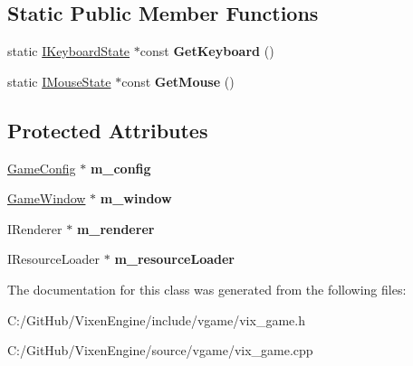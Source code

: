 \subsection*{Static Public Member Functions}
\begin{DoxyCompactItemize}
\item 
\hypertarget{class_vixen_1_1_game_add386b07418fc7e82e3e08884b9d6e81}{}static \hyperlink{class_vixen_1_1_i_keyboard_state}{I\+Keyboard\+State} $\ast$const {\bfseries Get\+Keyboard} ()\label{class_vixen_1_1_game_add386b07418fc7e82e3e08884b9d6e81}

\item 
\hypertarget{class_vixen_1_1_game_a35eaa19cca018f0536806ddccafc10c5}{}static \hyperlink{class_vixen_1_1_i_mouse_state}{I\+Mouse\+State} $\ast$const {\bfseries Get\+Mouse} ()\label{class_vixen_1_1_game_a35eaa19cca018f0536806ddccafc10c5}

\end{DoxyCompactItemize}
\subsection*{Protected Attributes}
\begin{DoxyCompactItemize}
\item 
\hypertarget{class_vixen_1_1_game_aa4387adbfcde68a48142de27e21d13d7}{}\hyperlink{class_vixen_1_1_game_config}{Game\+Config} $\ast$ {\bfseries m\+\_\+config}\label{class_vixen_1_1_game_aa4387adbfcde68a48142de27e21d13d7}

\item 
\hypertarget{class_vixen_1_1_game_a70ce88d7a768d448d12cd1dd1a35ec64}{}\hyperlink{class_vixen_1_1_game_window}{Game\+Window} $\ast$ {\bfseries m\+\_\+window}\label{class_vixen_1_1_game_a70ce88d7a768d448d12cd1dd1a35ec64}

\item 
\hypertarget{class_vixen_1_1_game_ac2ef4adaa4442c6afccb8adb8d0b3173}{}I\+Renderer $\ast$ {\bfseries m\+\_\+renderer}\label{class_vixen_1_1_game_ac2ef4adaa4442c6afccb8adb8d0b3173}

\item 
\hypertarget{class_vixen_1_1_game_aff8f829556f6551f37070592573c1d96}{}I\+Resource\+Loader $\ast$ {\bfseries m\+\_\+resource\+Loader}\label{class_vixen_1_1_game_aff8f829556f6551f37070592573c1d96}

\end{DoxyCompactItemize}


The documentation for this class was generated from the following files\+:\begin{DoxyCompactItemize}
\item 
C\+:/\+Git\+Hub/\+Vixen\+Engine/include/vgame/vix\+\_\+game.\+h\item 
C\+:/\+Git\+Hub/\+Vixen\+Engine/source/vgame/vix\+\_\+game.\+cpp\end{DoxyCompactItemize}
